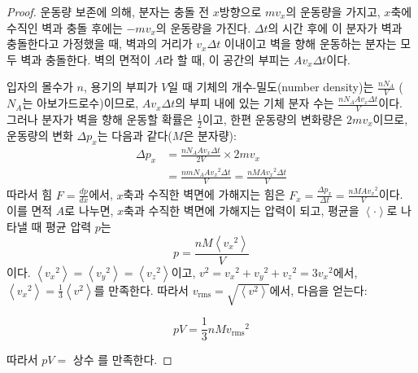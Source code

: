             \begin{proof}
            운동량 보존에 의해, 분자는 충돌 전 $x$방향으로 $mv_x$의 운동량을 가지고, $x$축에 수직인 벽과 충돌 후에는 $-mv_x$의 운동량을 가진다. $\Delta t$의 
            시간 후에 이 분자가 벽과 충돌한다고 가정했을 때, 벽과의 거리가 $v_x \Delta t$ 이내이고 벽을 향해 운동하는 분자는 모두 벽과 충돌한다. 
            벽의 면적이 $A$라 할 때, 이 공간의 부피는 $Av_x \Delta t$이다.
            \par 입자의 몰수가 $n$, 용기의 부피가 $V$일 때 기체의 
            개수-밀도(number density)는 $\displaystyle\frac{n N_A}{V}$ ($N_A$는 아보가드로수)이므로, $Av_x \Delta t$의 부피 내에 있는 기체 분자 수는 
            $\displaystyle\frac{n N_A A v_x \Delta t}{V}$이다. 그러나 분자가 벽을 향해 운동할 확률은 $\displaystyle\frac{1}{2}$이고, 한편 운동량의 변화량은 $2mv_x$이므로, 
            운동량의 변화 $\Delta p_x$는 다음과 같다($M$은 분자량):
                \begin{equation*}
                    \begin{aligned}
                        \Delta p_x &= \frac{nN_A A v_x \Delta t}{2V} \times 2 m v_x \\
                        &= \frac{nmN_A A {v_x}^2 \Delta t}{V} = \frac{nMA {v_x}^2 \Delta t}{V}
                    \end{aligned}
                \end{equation*}
            따라서 힘 $F = \frac{dp}{dx}$에서, $x$축과 수직한 벽면에 가해지는 힘은 $F_x = \displaystyle\frac{\Delta p_x}{\Delta t} = \frac{nMA {v_x}^2}{V}$이다. \\
            이를 면적 $A$로 나누면, $x$축과 수직한 벽면에 가해지는 압력이 되고, 평균을 $\left< \cdot \right>$로 나타낼 때 평균 압력 $p$는 
                \begin{equation*}
                    p = \frac{nM \left< {v_x}^2 \right>}{V}
                \end{equation*}
            이다. $\left< {v_x}^2 \right> = \left< {v_y}^2 \right> = \left< {v_z}^2 \right>$이고, $v^2 = {v_x}^2 + {v_y}^2 + {v_z}^2 = 3 {v_x}^2$에서, 
            $\left< {v_x}^2 \right> = \frac{1}{3} \left< v^2 \right>$를 만족한다. 따라서 $v_{\mathrm{rms}} = \sqrt{\left\langle v^2 \right\rangle}$에서, 
            다음을 얻는다:
            \begin{obs}\label{pvconst}
                \begin{equation*}
                    pV = \frac{1}{3} n M {v_\mathrm{rms}}^2
                \end{equation*}
            \end{obs}
            따라서 $pV =$ 상수 를 만족한다.
            \end{proof}
